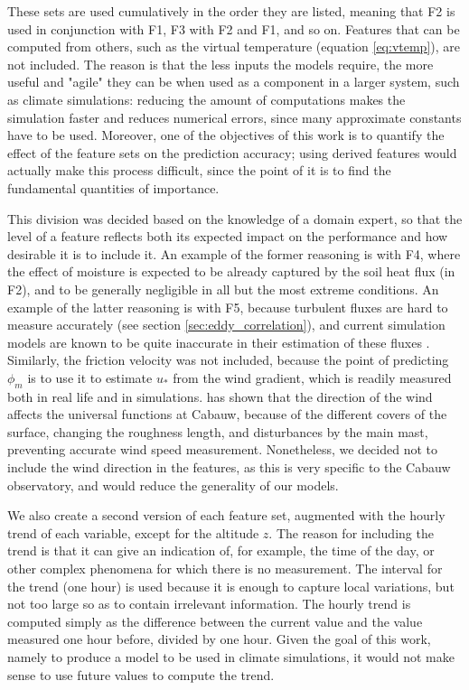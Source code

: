 \documentclass[a4paper]{book}
\begin{document}
These sets are used cumulatively in the order they are listed, meaning that F2 is used in conjunction with F1, F3 with F2 and F1, and so on. Features that can be computed from others, such as the virtual temperature (equation \ref{eq:vtemp}), are not included. The reason is that the less inputs the models require, the more useful and "agile" they can be when used as a component in a larger system, such as climate simulations: reducing the amount of computations makes the simulation faster and reduces numerical errors, since many approximate constants have to be used. Moreover, one of the objectives of this work is to quantify the effect of the feature sets on the prediction accuracy; using derived features would actually make this process difficult, since the point of it is to find the fundamental quantities of importance.

This division was decided based on the knowledge of a domain expert, so that the level of a feature reflects both its expected impact on the performance and how desirable it is to include it. An example of the former reasoning is with F4, where the effect of moisture is expected to be already captured by the soil heat flux (in F2), and to be generally negligible in all but the most extreme conditions. An example of the latter reasoning is with F5, because turbulent fluxes are hard to measure accurately (see section \ref{sec:eddy_correlation}), and current simulation models are known to be quite inaccurate in their estimation of these fluxes \citep{sheba}. Similarly, the friction velocity was not included, because the point of predicting $\phi_m$ is to use it to estimate $u_*$ from the wind gradient, which is readily measured both in real life and in simulations. \cite{cabauw_z0} has shown that the direction of the wind affects the universal functions at Cabauw, because of the different covers of the surface, changing the roughness length, and disturbances by the main mast, preventing accurate wind speed measurement. Nonetheless, we decided not to include the wind direction in the features, as this is very specific to the Cabauw observatory, and would reduce the generality of our models.

We also create a second version of each feature set, augmented with the hourly trend of each variable, except for the altitude $z$. The reason for including the trend is that it can give an indication of, for example, the time of the day, or other complex phenomena for which there is no measurement. The interval for the trend (one hour) is used because it is enough to capture local variations, but not too large so as to contain irrelevant information. The hourly trend is computed simply as the difference between the current value and the value measured one hour before, divided by one hour. Given the goal of this work, namely to produce a model to be used in climate simulations, it would not make sense to use future values to compute the trend.
\end{document}
